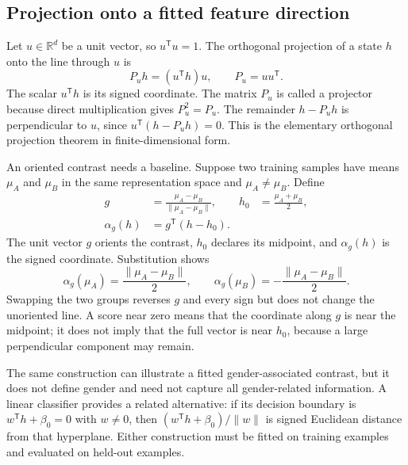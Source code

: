 \documentclass[
  aps,
  reprint,
  superscriptaddress,
  floatfix,
  nofootinbib,
  longbibliography
]{revtex4-2}
\newcommand{\R}{\mathbb{R}}
\newcommand{\T}{^{\mathsf T}}
\newcommand{\norm}[1]{\lVert #1\rVert}
\begin{document}
\subsection{Projection onto a fitted feature direction}

Let $u\in\R^d$ be a unit vector, so $u\T u=1$.  The orthogonal projection of a
state $h$ onto the line through $u$ is
\begin{equation}
 P_u h=(u\T h)u,
 \qquad P_u=uu\T .
 \label{eq:projection-app}
\end{equation}
The scalar $u\T h$ is its signed coordinate.  The matrix $P_u$ is called a
projector because direct multiplication gives $P_u^2=P_u$.  The remainder
$h-P_u h$ is perpendicular to $u$, since
$u\T(h-P_u h)=0$.  This is the elementary orthogonal projection theorem in
finite-dimensional form.

An oriented contrast needs a baseline.  Suppose two training samples have
means $\mu_A$ and $\mu_B$ in the same representation space and
$\mu_A\ne\mu_B$.  Define
\begin{equation}
\begin{aligned}
 g&=\frac{\mu_A-\mu_B}{\norm{\mu_A-\mu_B}},
 &h_0&=\frac{\mu_A+\mu_B}{2},\\
 \alpha_g(h)&=g\T(h-h_0).
\end{aligned}
 \label{eq:signed-axis-app}
\end{equation}
The unit vector $g$ orients the contrast, $h_0$ declares its midpoint, and
$\alpha_g(h)$ is the signed coordinate.  Substitution shows
\begin{equation}
 \alpha_g(\mu_A)=\frac{\norm{\mu_A-\mu_B}}{2},
 \qquad
 \alpha_g(\mu_B)=-\frac{\norm{\mu_A-\mu_B}}{2}.
 \label{eq:mean-scores-app}
\end{equation}
Swapping the two groups reverses $g$ and every sign but does not change the
unoriented line.  A score near zero means that the coordinate along $g$ is near
the midpoint; it does not imply that the full vector is near $h_0$, because a
large perpendicular component may remain.

The same construction can illustrate a fitted gender-associated contrast,
but it does not define gender and need not capture all gender-related
information.  A linear classifier provides a related alternative: if its
decision boundary is $w\T h+\beta_0=0$ with $w\ne0$, then
$(w\T h+\beta_0)/\norm w$ is signed Euclidean distance from that hyperplane.
Either construction must be fitted on training examples and evaluated on
held-out examples.
\end{document}
